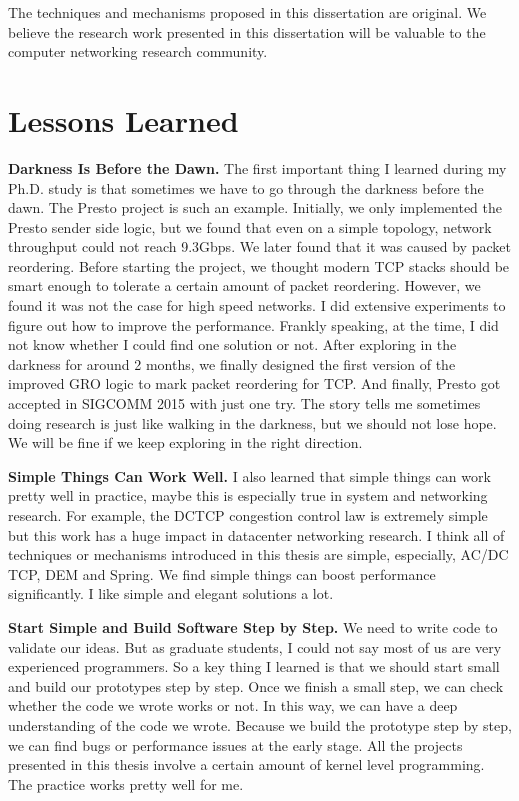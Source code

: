 The techniques and mechanisms proposed in this dissertation are original. 
We believe the research work presented in this dissertation will be valuable to 
the computer networking research community.

\section{Lessons Learned}
{\bf Darkness Is Before the Dawn.}
The first important thing I learned during my Ph.D. study is that sometimes 
we have to go through the darkness before the dawn. The Presto project is such an example. 
Initially, we only implemented the Presto sender side logic, but we found that even on a simple topology, 
network throughput could not reach 9.3Gbps. We later found that it was caused by packet reordering. 
Before starting the project, we thought modern TCP stacks should be smart enough to tolerate 
a certain amount of packet reordering. However, we found it was not the case for high speed networks. 
I did extensive experiments to figure out how to improve the performance. 
Frankly speaking, at the time, I did not know whether I could find one solution or not. 
After exploring in the darkness for around 2 months, we finally designed the first version of the 
improved GRO logic to mark packet reordering for TCP. And finally, Presto got accepted in 
SIGCOMM 2015 with just one try. The story tells me sometimes doing research is just like 
walking in the darkness, but we should not lose hope. We will be fine if we keep exploring in the right direction.

{\bf Simple Things Can Work Well.}
I also learned that simple things can work pretty well in practice, maybe this is 
especially true in system and networking research. For example, the DCTCP congestion control law is extremely 
simple but this work has a huge impact in datacenter networking research. I think 
all of techniques or mechanisms introduced in this thesis are simple, especially, AC/DC TCP, DEM and Spring. 
We find simple things can boost performance significantly. I like simple and elegant solutions a lot. 

{\bf Start Simple and Build Software Step by Step.}
We need to write code to validate our ideas. But as graduate students, I could not say 
most of us are very experienced programmers. So a key thing I learned is that we should start small and 
build our prototypes step by step. Once we finish a small step, we can check whether 
the code we wrote works or not. In this way, we can have a deep understanding of the code we wrote. 
Because we build the prototype step by step, we can find bugs or performance issues at the early stage. 
All the projects presented in this thesis involve a certain amount of kernel level programming. 
The practice works pretty well for me.

